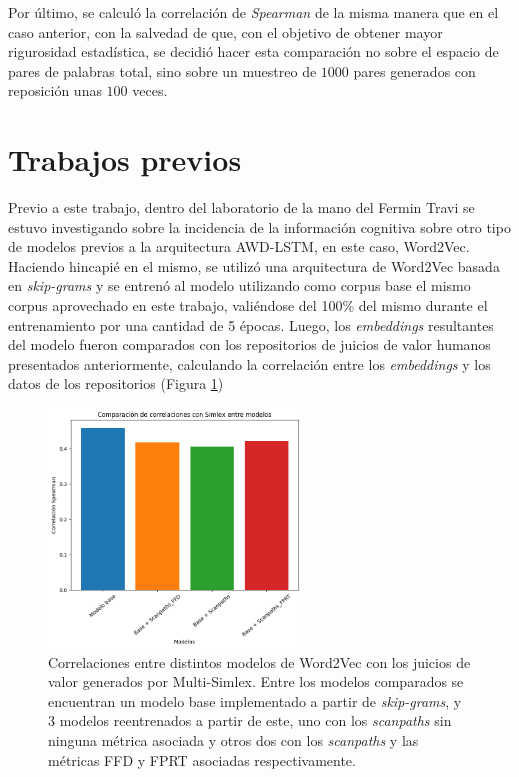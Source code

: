 Por último, se calculó la correlación de \textit{Spearman} de la misma manera que en el caso anterior, 
con la salvedad de que, con el objetivo de obtener mayor rigurosidad estadística, se decidió 
hacer esta comparación no sobre el espacio de pares de palabras total, sino sobre un muestreo 
de $1000$ pares generados con reposición unas $100$ veces.

\section{Trabajos previos}

\label{sec:trabajos_previos}

Previo a este trabajo, dentro del laboratorio de la mano del %
 Fermin Travi se estuvo 
investigando sobre la incidencia de la información cognitiva sobre otro tipo de modelos previos 
a la arquitectura AWD-LSTM, en este caso, Word2Vec. Haciendo hincapié en el mismo, se utilizó una arquitectura de Word2Vec basada en \textit{skip-grams} y 
se entrenó al modelo utilizando como corpus base el mismo corpus aprovechado en este trabajo, 
valiéndose del 100\% del mismo durante el entrenamiento por una cantidad de 5 épocas. 
Luego, los \textit{embeddings} resultantes del modelo fueron comparados con los repositorios de 
juicios de valor humanos presentados anteriormente, calculando la correlación entre los 
\textit{embeddings} y los datos de los repositorios (Figura \ref{fig:simlex_word2vec})

\begin{figure}[htb]
    \centering
    \includegraphics[width=0.6\textwidth]{imagenes/simlex_word2vec.png}
    \caption{Correlaciones entre distintos modelos de Word2Vec con los juicios de valor generados 
    por Multi-Simlex. Entre los modelos comparados se encuentran un modelo base implementado a 
    partir de \textit{skip-grams}, y 3 modelos reentrenados a partir de este, uno con los \textit{scanpaths} sin 
    ninguna métrica asociada y otros dos con los \textit{scanpaths} y las métricas FFD y FPRT asociadas 
    respectivamente.}
    \label{fig:simlex_word2vec}
\end{figure}

